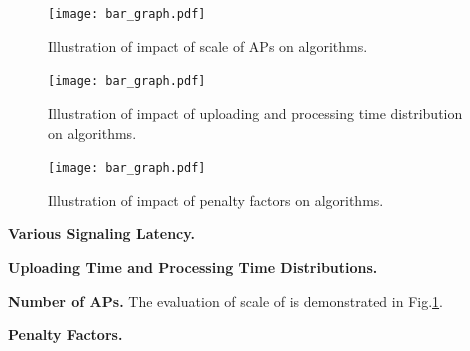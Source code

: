 \begin{figure}[hbt]                                                 %
    \centering                                                      %
    \texttt{[image: bar\_graph.pdf]}           %
    \caption{Illustration of impact of scale of APs on algorithms.}
    \label{fig:ss_scale}                                            %
\end{figure}                                                        %

\begin{figure}[hbt]                                                 %
    \centering                                                      %
    \texttt{[image: bar\_graph.pdf]}           %
    \caption{Illustration of impact of uploading and processing time distribution on algorithms.}
    \label{fig:ss_dist}                                             %
\end{figure}                                                        %

\begin{figure}[hbt]                                                 %
    \centering                                                      %
    \texttt{[image: bar\_graph.pdf]}           %
    \caption{Illustration of impact of penalty factors on algorithms.}
    \label{fig:ss_penalty}                                          %
\end{figure}                                                        %

\textbf{Various Signaling Latency.}

\textbf{Uploading Time and Processing Time Distributions.}

\textbf{Number of APs.} %
The evaluation of scale of is demonstrated in Fig.\ref{fig:ss_scale}.

\textbf{Penalty Factors.}

